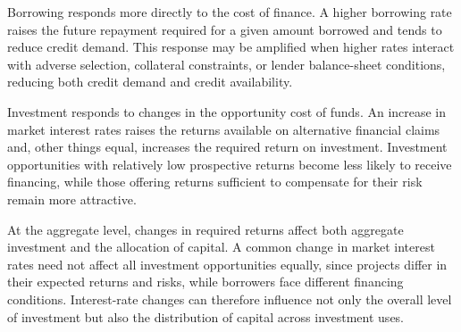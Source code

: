 Borrowing responds more directly to the cost of finance. A higher borrowing rate raises the future repayment required for a given amount borrowed and tends to reduce credit demand. This response may be amplified when higher rates interact with adverse selection, collateral constraints, or lender balance-sheet conditions, reducing both credit demand and credit availability.

Investment responds to changes in the opportunity cost of funds. An increase in market interest rates raises the returns available on alternative financial claims and, other things equal, increases the required return on investment. Investment opportunities with relatively low prospective returns become less likely to receive financing, while those offering returns sufficient to compensate for their risk remain more attractive.

At the aggregate level, changes in required returns affect both aggregate investment and the allocation of capital. A common change in market interest rates need not affect all investment opportunities equally, since projects differ in their expected returns and risks, while borrowers face different financing conditions. Interest-rate changes can therefore influence not only the overall level of investment but also the distribution of capital across investment uses.

